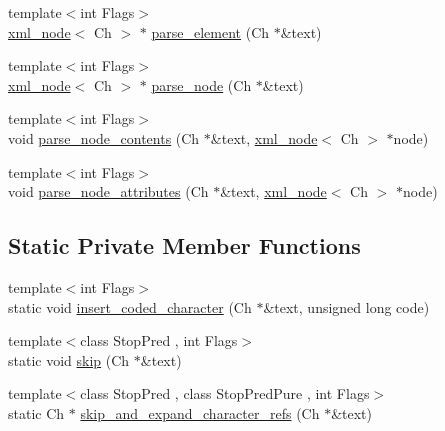 \begin{DoxyCompactItemize}
{\footnotesize template$<$int Flags$>$ }\\\mbox{\hyperlink{classrapidxml_1_1xml__node}{xml\+\_\+node}}$<$ Ch $>$ $\ast$ \mbox{\hyperlink{classrapidxml_1_1xml__document_aea385acd096ab200d63a777d53435ada}{parse\+\_\+element}} (Ch $\ast$\&text)
\item 
{\footnotesize template$<$int Flags$>$ }\\\mbox{\hyperlink{classrapidxml_1_1xml__node}{xml\+\_\+node}}$<$ Ch $>$ $\ast$ \mbox{\hyperlink{classrapidxml_1_1xml__document_a5e94cbc9b02e864cb80961ddb8cc63a7}{parse\+\_\+node}} (Ch $\ast$\&text)
\item 
{\footnotesize template$<$int Flags$>$ }\\void \mbox{\hyperlink{classrapidxml_1_1xml__document_aae0a4c2e1972ab9a9e0ce91cf1166ac9}{parse\+\_\+node\+\_\+contents}} (Ch $\ast$\&text, \mbox{\hyperlink{classrapidxml_1_1xml__node}{xml\+\_\+node}}$<$ Ch $>$ $\ast$node)
\item 
{\footnotesize template$<$int Flags$>$ }\\void \mbox{\hyperlink{classrapidxml_1_1xml__document_ac0b3cd07b3d5cbaa83762a196c681519}{parse\+\_\+node\+\_\+attributes}} (Ch $\ast$\&text, \mbox{\hyperlink{classrapidxml_1_1xml__node}{xml\+\_\+node}}$<$ Ch $>$ $\ast$node)
\end{DoxyCompactItemize}
\subsection*{Static Private Member Functions}
\begin{DoxyCompactItemize}
\item 
{\footnotesize template$<$int Flags$>$ }\\static void \mbox{\hyperlink{classrapidxml_1_1xml__document_ae33040bcfa8e5a29dc6f6f130984a981}{insert\+\_\+coded\+\_\+character}} (Ch $\ast$\&text, unsigned long code)
\item 
{\footnotesize template$<$class Stop\+Pred , int Flags$>$ }\\static void \mbox{\hyperlink{classrapidxml_1_1xml__document_a27aca5bdcb3bfa899f61b17d7f1d3a0d}{skip}} (Ch $\ast$\&text)
\item 
{\footnotesize template$<$class Stop\+Pred , class Stop\+Pred\+Pure , int Flags$>$ }\\static Ch $\ast$ \mbox{\hyperlink{classrapidxml_1_1xml__document_af86781975cdfff2105fa8c0b49ab4507}{skip\+\_\+and\+\_\+expand\+\_\+character\+\_\+refs}} (Ch $\ast$\&text)
\end{DoxyCompactItemize}
